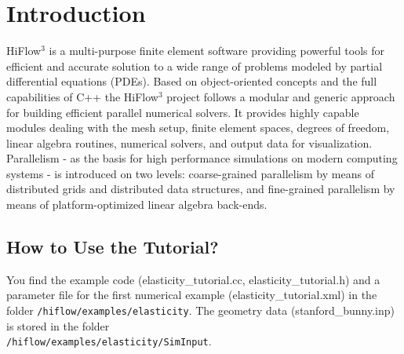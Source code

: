 \documentclass[a4paper, 11pt, twoside]{article}
\theoremstyle{plain}
\theoremstyle{definition}
\begin{document}
\thispagestyle{empty}







\newtheorem{remark}{Remark}[section]
\thispagestyle{empty}
\tableofcontents





\newpage
\pagestyle{plain}
\vspace{0.5cm}
\section{Introduction}

HiFlow$^3$ is a multi-purpose finite element software providing powerful tools for efficient and accurate solution to a wide range of problems modeled by partial differential equations (PDEs). Based on object-oriented concepts and the full capabilities of C++ the HiFlow$^3$ project follows a modular and generic approach for building efficient parallel numerical solvers. It provides highly capable modules dealing with the mesh setup, finite element spaces, degrees of freedom, linear algebra routines, numerical solvers, and output data for visualization. Parallelism - as the basis for high performance simulations on modern computing systems - is introduced on two levels: coarse-grained parallelism by means of distributed grids and distributed data structures, and fine-grained parallelism by means of platform-optimized linear algebra back-ends.





\subsection{How to Use the Tutorial?}

You find the example code (elasticity\_tutorial.cc, elasticity\_tutorial.h) and a parameter file for the first numerical example (elasticity\_tutorial.xml) in the folder \verb'/hiflow/examples/elasticity'. The geometry data (stanford\_bunny.inp) is stored in the folder \\ \verb'/hiflow/examples/elasticity/SimInput'.
\end{document}
